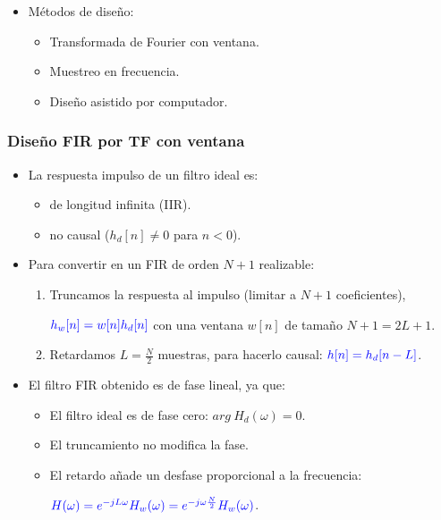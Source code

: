 \documentclass[handout]{beamer}
\numberwithin{section}{part}
\begin{document}
\begin{frame}
\begin{itemize}
    \item Métodos de diseño:
    \begin{itemize}
      \footnotesize
      \item Transformada de Fourier con ventana.
      \item \color{gray} Muestreo en frecuencia.\color{black}
      \item Diseño asistido por computador.
    \end{itemize}
    
  \end{itemize}
  
\end{frame}


\begin{frame}
  \frametitle{Diseño FIR por TF con ventana}
  
  \vspace{-0.2cm}
  \begin{itemize}
    \item La respuesta impulso de un filtro ideal es:
    \begin{itemize}
      \item de longitud infinita (IIR).
      \item no causal ($h_d[n]\neq0$ para $n<0$).
    \end{itemize}
    \item \alert{Para convertir en un FIR de orden $N+1$ realizable:}
    \begin{enumerate}
      \footnotesize
      \item Truncamos la respuesta al impulso (limitar a $N+1$ coeficientes),  
      \begin{center}$\color{blue}h_w[n]=w[n]h_d[n]$ con una ventana $w[n]$ de tamaño $N+1=2L+1$.\end{center}
      \item Retardamos $L=\frac{N}{2}$ muestras, para hacerlo causal: $\color{blue}h[n]=h_d[n-L]$. 
    \end{enumerate}
    \item El filtro FIR obtenido es de fase lineal, ya que:
    \begin{itemize}
      \item El filtro ideal es de fase cero: $arg~H_d(\omega)=0$.
      \item El truncamiento no modifica la fase.
      \item El retardo añade un desfase proporcional a la frecuencia:
      \begin{center}$\color{blue}H(\omega)=e^{-jL\omega}H_w(\omega)=e^{-j\omega\frac{N}{2}}H_w(\omega)$.\end{center}
    \end{itemize}
  \end{itemize}
  
\end{frame}
\end{document}
